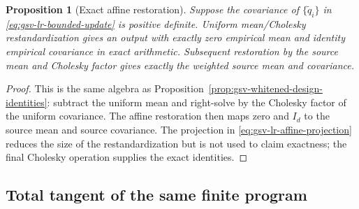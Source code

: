 \documentclass[11pt]{article}
\newtheorem{proposition}{Proposition}[section]
\theoremstyle{definition}
\theoremstyle{remark}
\begin{document}
\begin{proposition}[Exact affine restoration]
\label{prop:gsv-lr-affine-restoration}
Suppose the covariance of $\{\widetilde q_i\}$ in
\eqref{eq:gsv-lr-bounded-update} is positive definite.  Uniform
mean/Cholesky restandardization gives an output with exactly zero empirical
mean and identity empirical covariance in exact arithmetic.  Subsequent
restoration by the source mean and Cholesky factor gives exactly the weighted
source mean and covariance.
\end{proposition}

\begin{proof}
This is the same algebra as
Proposition~\ref{prop:gsv-whitened-design-identities}: subtract the uniform
mean and right-solve by the Cholesky factor of the uniform covariance.  The
affine restoration then maps zero and $I_d$ to the source mean and source
covariance.  The projection in \eqref{eq:gsv-lr-affine-projection} reduces
the size of the restandardization but is not used to claim exactness; the
final Cholesky operation supplies the exact identities.
\end{proof}

\subsection{Total tangent of the same finite program}
\end{document}
